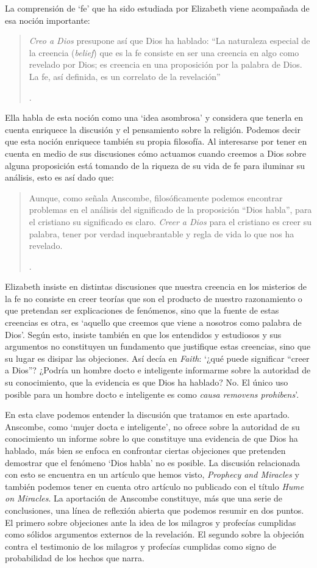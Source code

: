 La comprensión de `fe' que ha sido estudiada por Elizabeth viene acompañada de esa noción importante: \blockquote[{\Cite[185]{conesa1994cc}}.]{\emph{Creo a Dios} presupone así que Dios ha hablado: \enquote{La naturaleza especial de la creencia (\emph{belief}) que es la fe consiste en ser una creencia en algo como revelado por Dios; es creencia en una proposición por la palabra de Dios. La fe, así definida, es un correlato de la revelación}}. Ella habla de esta noción como una `idea asombrosa' y considera que tenerla en cuenta enriquece la discusión y el pensamiento sobre la religión. Podemos decir que esta noción enriquece también su propia filosofía. Al interesarse por tener en cuenta en medio de sus discusiones cómo actuamos cuando creemos a Dios sobre alguna proposición está tomando de la riqueza de su vida de fe para iluminar su análisis, esto es así dado que: \blockquote[{\Cite[185]{conesa1994cc}}.]{Aunque, como señala Anscombe, filosóficamente podemos encontrar problemas en el análisis del significado de la proposición \enquote{Dios habla}, para el cristiano su significado es claro. \emph{Creer a Dios} para el cristiano es creer su palabra, tener por verdad inquebrantable y regla de vida lo que nos ha revelado.} Elizabeth insiste en distintas discusiones que nuestra creencia en los misterios de la fe no consiste en creer teorías que son el producto de nuestro razonamiento o que pretendan ser explicaciones de fenómenos, sino que la fuente de estas creencias es otra, es \enquote*{aquello que creemos que viene a nosotros como palabra de Dios}. Según esto, insiste también en que los entendidos y estudiosos y sus argumentos no constituyen un fundamento que justifique estas creencias, sino que su lugar es disipar las objeciones. Así decía en \emph{Faith}: \enquote*{¿qué puede significar ``creer a Dios''? ¿Podría un hombre docto e inteligente informarme sobre la autoridad de su conocimiento, que la evidencia es que Dios ha hablado? No. El único uso posible para un hombre docto e inteligente es como \emph{causa removens prohibens}}.

En esta clave podemos entender la discusión que tratamos en este apartado. Anscombe, como `mujer docta e inteligente', no ofrece sobre la autoridad de su conocimiento un informe sobre lo que constituye una evidencia de que Dios ha hablado, más bien se enfoca en confrontar ciertas objeciones que pretenden demostrar que el fenómeno `Dios habla' no es posible. La discusión relacionada con esto se encuentra en un artículo que hemos visto, \emph{Prophecy and Miracles} y también podemos tener en cuenta otro artículo no publicado con el título \emph{Hume on Miracles}. La aportación de Anscombe constituye, más que una serie de conclusiones, una línea de reflexión abierta que podemos resumir en dos puntos. El primero sobre objeciones ante la idea de los milagros y profecías cumplidas como sólidos argumentos externos de la revelación. El segundo sobre la objeción contra el testimonio de los milagros y profecías cumplidas como signo de probabilidad de los hechos que narra.

